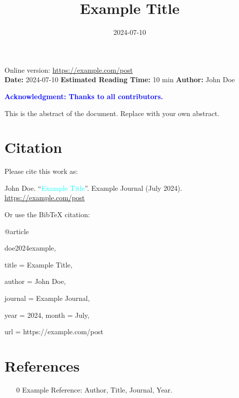 \documentclass[12pt]{article}
\title{Example Title}
\date{2024-07-10}
\begin{document}
\maketitle
\begin{center}
    Online version: \url{https://example.com/post} \\
    \textbf{Date:} 2024-07-10 \quad
    \textbf{Estimated Reading Time:} 10 min \quad
    \textbf{Author:} John Doe
\end{center}

\noindent
\textcolor{blue}{\textbf{Acknowledgment: Thanks to all contributors.}}

This is the abstract of the document. Replace with your own abstract.


\newpage
\tableofcontents
\newpage
\vspace{1em}

\section{Citation}
Please cite this work as:

\begin{tcolorbox}[colback=black!5!white, colframe=black!80!white, boxrule=0.5pt, arc=2mm, left=1mm, right=1mm, top=1mm, bottom=1mm]
John Doe. ``\textcolor{cyan}{Example Title}''. Example Journal (July 2024). \url{https://example.com/post}
\end{tcolorbox}

Or use the BibTeX citation:

\begin{tcolorbox}[
    colback=black!5!white,
    colframe=black!80!white,
    boxrule=0.5pt,
    arc=2mm,
    left=1mm,
    right=1mm,
    top=1mm,
    bottom=1mm,
    listing only,
    listing options={
      basicstyle=\ttfamily\footnotesize,
      breaklines=true,
      literate={\{}{{\char`\{}}1 {\}}{{\char`\}}}1
    }
  ]
  @article{doe2024example,

    title   = {Example Title},

    author  = {John Doe},

    journal = {Example Journal},

    year    = {2024},
    month   = {July},

    url     = {https://example.com/post}

  }
  \end{tcolorbox}

\newpage
\section{References}


\begin{itemize}
    \item [0] Example Reference: Author, Title, Journal, Year.
\end{itemize}
\end{document}
